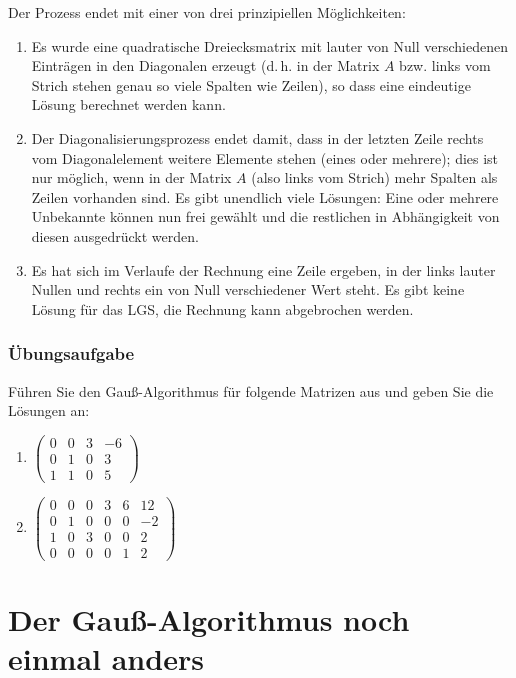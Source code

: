 Der Prozess endet mit einer von drei prinzipiellen Möglichkeiten:
\begin{enumerate}
  \item Es wurde eine quadratische Dreiecksmatrix mit lauter von Null verschiedenen Einträgen in den Diagonalen erzeugt (d.\,h. in der Matrix $A$ bzw. links vom Strich stehen genau so viele Spalten wie Zeilen), so dass eine eindeutige Lösung berechnet werden kann.
  \item Der Diagonalisierungsprozess endet damit, dass in der letzten Zeile rechts vom Diagonalelement weitere Elemente stehen (eines oder mehrere); dies ist nur möglich, wenn in der Matrix $A$ (also links vom Strich) mehr Spalten als Zeilen vorhanden sind. Es gibt unendlich viele Lösungen: Eine oder mehrere Unbekannte können nun frei gewählt und die restlichen in Abhängigkeit von diesen ausgedrückt werden.
  \item Es hat sich im Verlaufe der Rechnung eine Zeile ergeben, in der links lauter Nullen und rechts ein von Null verschiedener Wert steht. Es gibt keine Lösung für das LGS, die Rechnung kann abgebrochen werden.
\end{enumerate}

\subsubsection{Übungsaufgabe}

\begin{graukasten}
  Führen Sie den Gauß-Algorithmus für folgende Matrizen aus und geben Sie die Lösungen an:
  \begin{enumerate}[label=\alph*)]
    \item $\left(\begin{array}{ccc|c} 0 & 0 & 3 & -6\\ 0 & 1 & 0 & 3\\ 1 & 1 & 0 & 5 \end{array}\right)$
    \item $\left(\begin{array}{ccccc|c} 0 & 0 & 0 & 3 & 6 & 12\\ 0 & 1 & 0 & 0 & 0 & -2\\ 1 & 0 & 3 & 0 & 0 & 2\\ 0 & 0 & 0 & 0 & 1 & 2 \end{array}\right)$
  \end{enumerate}
\end{graukasten}

\section{Der Gauß-Algorithmus noch einmal anders}

